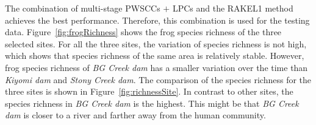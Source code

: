 The combination of multi-stage PWSCCs $+$ LPCs and the RAKEL1 method achieves the best performance. Therefore, this combination is used for the testing data. 
Figure~\ref{fig:frogRichness} shows the frog species richness of the three selected sites. For all the three sites, the variation of species richness is not high, which shows that species richness of the same area is relatively stable. However, frog species richness of \textit{BG Creek dam} has a smaller variation over the time than \textit{Kiyomi dam} and \textit{Stony Creek dam}. The comparison of the species richness for the three sites is shown in Figure~\ref{fig:richnessSite}. In contrast to other sites, the species richness in \textit{BG Creek dam} is the highest. This might be that \textit{BG Creek dam} is closer to a river and farther away from the human community.


